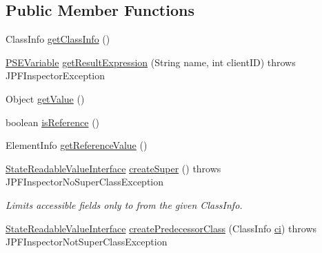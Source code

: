\subsection*{Public Member Functions}
\begin{DoxyCompactItemize}
\item 
Class\+Info \hyperlink{classgov_1_1nasa_1_1jpf_1_1inspector_1_1server_1_1programstate_1_1_state_element_info_a00c33712f1d1d064225c4c2ef7af857e}{get\+Class\+Info} ()
\item 
\hyperlink{classgov_1_1nasa_1_1jpf_1_1inspector_1_1common_1_1pse_1_1_p_s_e_variable}{P\+S\+E\+Variable} \hyperlink{classgov_1_1nasa_1_1jpf_1_1inspector_1_1server_1_1programstate_1_1_state_element_info_aa6d6676a0e787affb77d9b1a04dde3bf}{get\+Result\+Expression} (String name, int client\+ID)  throws J\+P\+F\+Inspector\+Exception 
\item 
Object \hyperlink{classgov_1_1nasa_1_1jpf_1_1inspector_1_1server_1_1programstate_1_1_state_element_info_a8955bc3991b2e757ee9057343fbcf741}{get\+Value} ()
\item 
boolean \hyperlink{classgov_1_1nasa_1_1jpf_1_1inspector_1_1server_1_1programstate_1_1_state_element_info_a913e29e54a56f2bd28e21b6f559c2107}{is\+Reference} ()
\item 
Element\+Info \hyperlink{classgov_1_1nasa_1_1jpf_1_1inspector_1_1server_1_1programstate_1_1_state_element_info_a288cfe76be58ea3fbb1f4c2cdc3b84fb}{get\+Reference\+Value} ()
\item 
\hyperlink{interfacegov_1_1nasa_1_1jpf_1_1inspector_1_1server_1_1programstate_1_1_state_readable_value_interface}{State\+Readable\+Value\+Interface} \hyperlink{classgov_1_1nasa_1_1jpf_1_1inspector_1_1server_1_1programstate_1_1_state_element_info_a6b70b90de3ef017566b25a6175dcb114}{create\+Super} ()  throws J\+P\+F\+Inspector\+No\+Super\+Class\+Exception 
\begin{DoxyCompactList}\small\item\em Limits accessible fields only to from the given Class\+Info. \end{DoxyCompactList}\item 
\hyperlink{interfacegov_1_1nasa_1_1jpf_1_1inspector_1_1server_1_1programstate_1_1_state_readable_value_interface}{State\+Readable\+Value\+Interface} \hyperlink{classgov_1_1nasa_1_1jpf_1_1inspector_1_1server_1_1programstate_1_1_state_element_info_abf17bc782b49d45f41b3a4f5a5ebf8de}{create\+Predecessor\+Class} (Class\+Info \hyperlink{classgov_1_1nasa_1_1jpf_1_1inspector_1_1server_1_1programstate_1_1_state_element_info_acdd8034996961333e13ef1821a8f5cbf}{ci})  throws J\+P\+F\+Inspector\+Not\+Super\+Class\+Exception 

\end{DoxyCompactItemize}
